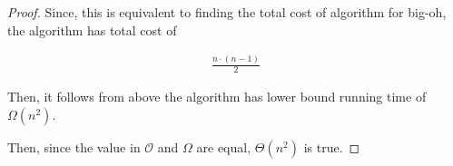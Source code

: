 \documentclass[12pt]{article}
\begin{document}
\begin{enumerate}[a.]
\begin{proof}
        \bigskip

        Since, this is equivalent to finding the total cost of algorithm for big-oh,
        the algorithm has total cost of

        \begin{align}
            \frac{n \cdot (n-1)}{2}
        \end{align}

        \bigskip

        Then, it follows from above the algorithm has lower bound running time of
        $\Omega(n^2)$.

        \bigskip

        Then, since the value in $\mathcal{O}$ and $\Omega$ are equal, $\Theta(n^2)$
        is true.
    \end{proof}

\end{enumerate}
\end{document}
